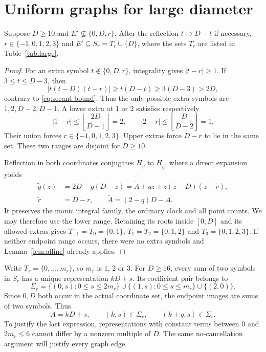 \section{Uniform graphs for large diameter}
\label{sec:large}

\begin{lemma}
\label{lem:alphabet}
Suppose $D\ge10$ and $E'\not\subseteq\{0,D,r\}$.
After the reflection $t\mapsto D-t$ if necessary,
$r\in\{-1,0,1,2,3\}$ and
$E'\subseteq S_r=T_r\cup\{D\}$, where the sets $T_r$ are
listed in Table~\ref{tab:large}.
\end{lemma}
\begin{proof}
For an extra symbol $t\notin\{0,D,r\}$, integrality gives
$|t-r|\ge1$. If $3\le t\le D-3$, then
\[
 |t(t-D)(t-r)|\ge t(D-t)\ge3(D-3)>2D,
\]
contrary to \eqref{eq:secant-bound}. Thus the only possible extra
symbols are $1,2,D-2,D-1$. A lower extra at $1$ or $2$ satisfies
respectively
\[
 |1-r|\le\left\lfloor\frac{2D}{D-1}\right\rfloor=2,
 \qquad
 |2-r|\le\left\lfloor\frac{D}{D-2}\right\rfloor=1.
\]
Their union forces $r\in\{-1,0,1,2,3\}$. Upper extras force
$D-r$ to lie in the same set. These two ranges are disjoint for
$D\ge10$.

Reflection in both coordinates conjugates $H_g$ to $H_{\widetilde g}$,
where a direct expansion yields
\begin{align*}
 \widetilde g(z)&=2D-g(D-z)
   =\widetilde A+qz+z(z-D)(z-\widetilde r),\\
 \widetilde r&=D-r,\qquad \widetilde A=(2-q)D-A.
\end{align*}
It preserves the monic integral family, the ordinary clock and all
point counts. We may therefore use the lower range. Retaining its
roots inside $[0,D]$ and its allowed extras gives
$T_{-1}=T_0=\{0,1\}$,
$T_1=T_2=\{0,1,2\}$ and $T_3=\{0,1,2,3\}$.
If neither endpoint range occurs, there were no extra symbols and
Lemma~\ref{lem:affine} already applies.
\end{proof}

Write $T_r=\{0,\ldots,m_r\}$, so $m_r$ is $1$, $2$ or $3$.
For $D\ge16$, every sum of two symbols in $S_r$ has a unique
representation $kD+s$. Its coefficient pair belongs to
\begin{equation}
 \Sigma_r=\{(0,s):0\le s\le2m_r\}
 \cup\{(1,s):0\le s\le m_r\}\cup\{(2,0)\}.
 \label{eq:sigma}
\end{equation}
Since $0,D$ both occur in the actual coordinate set, the endpoint
images are sums of two symbols. Thus
\begin{equation}
 A=kD+s,\qquad (k,s)\in\Sigma_r,\qquad
 (k+q,s)\in\Sigma_r.
 \label{eq:symbolic-cases}
\end{equation}
To justify the last expression, representations with constant terms
between $0$ and $2m_r\le6$ cannot differ by a nonzero multiple of
$D$. The same no-cancellation argument will justify every graph edge.

